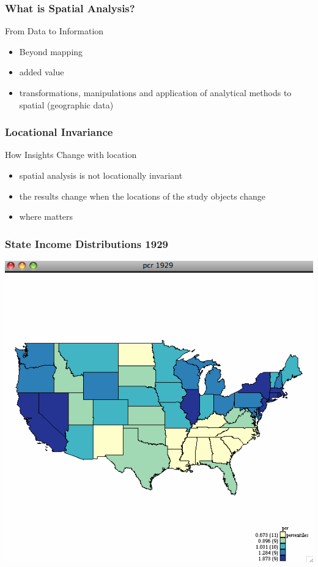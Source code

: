 \documentclass[nototal,handout]{beamer}
\begin{document}
\begin{frame}
	\frametitle{What is Spatial Analysis?}
 
\begin{block}{From Data to Information}
 \begin{itemize}
 \item  \alert{Beyond} mapping
 \item  \alert{added value}
 \item  transformations, manipulations and application of analytical methods to spatial (geographic data)
 \end{itemize}
 \end{block} \end{frame} 

\begin{frame}
	\frametitle{Locational Invariance}
 
\begin{block}{How Insights  Change with location}
 \begin{itemize}
 \item  spatial analysis is \alert{not} locationally invariant
 \item  the results change when the locations of the study objects change
 \item  \alert{where} matters
 \end{itemize}
 \end{block} \end{frame} 

\begin{frame}
	\frametitle{State Income Distributions 1929}
 \begin{center}
 \includegraphics[width=.65\linewidth]{income29.png}
  \end{center}
 \end{frame} 
\end{document}
